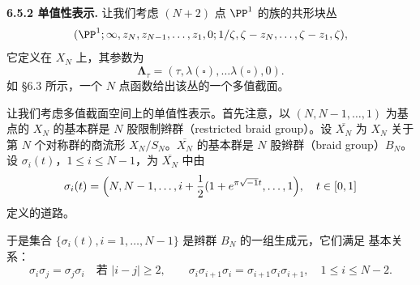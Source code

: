 \noindent\textbf{6.5.2 单值性表示.}\quad
让我们考虑 $(N+2)$ 点 $\PP^1$ 的族的共形块丛
\[
(\PP^1;\infty,z_N,z_{N-1},\dots,z_1,0;
1/\zeta,\zeta-z_N,\dots,\zeta-z_1,\zeta),
\]
它定义在 $X_N$ 上，其参数为
\begin{equation}
\mathbf{\Lambda}_\tau=(\tau,\lambda(\square),\dots\lambda(\square),0).
\tag{6.38}
\end{equation}
如 §6.3 所示，一个 $N$ 点函数给出该丛的一个多值截面。

让我们考虑多值截面空间上的单值性表示。首先注意，以
$(N,N-1,\dots,1)$ 为基点的 $X_N$ 的基本群是 $N$ 股限制辫群（restricted braid
group）。设 $\overline{X_N}$ 为 $X_N$ 关于第 $N$ 个对称群的商流形
$X_N/S_N$。$\overline{X_N}$ 的基本群是 $N$ 股辫群（braid group）$B_N$。设
$\sigma_i(t)$，$1\le i\le N-1$，为 $\overline{X_N}$ 中由
\[
\sigma_i(t)=\Bigl(N,N-1,\dots,i+\frac{1}{2}(1+e^{\pi\sqrt{-1}t},\dots,1\Bigr),
\quad t\in[0,1]
\]
定义的道路。

于是集合 $\{\sigma_i(t),i=1,\dots,N-1\}$ 是辫群 $B_N$ 的一组生成元，它们满足
基本关系：
\[
\sigma_i\sigma_j=\sigma_j\sigma_i\quad\text{若 }|i-j|\ge2,\qquad
\sigma_i\sigma_{i+1}\sigma_i=\sigma_{i+1}\sigma_i\sigma_{i+1},\quad
1\le i\le N-2.
\]

